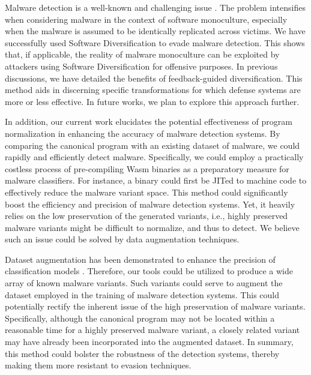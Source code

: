 \begin{strategy}

    Malware detection is a well-known and challenging issue \cite{cohen1987computer}. 
    The problem intensifies when considering malware in the context of software monoculture, especially when the malware is assumed to be identically replicated across victims. 
    We have successfully used Software Diversification to evade malware detection. 
    This shows that, if applicable, the reality of malware monoculture can be exploited by attackers using Software Diversification for offensive purposes. 
    In previous discussions, we have detailed the benefits of feedback-guided diversification. 
    This method aids in discerning specific transformations for which defense systems are more or less effective.
    In future works, we plan to explore this approach further.

    In addition, our current work elucidates the potential effectiveness of program normalization in enhancing the accuracy of malware detection systems. 
    By comparing the canonical program with an existing dataset of malware, we could rapidly and efficiently detect malware.
    Specifically, we could employ a practically costless process of pre-compiling Wasm binaries as a preparatory measure for malware classifiers. 
    For instance, a \wasm binary could first be JITed to machine code to effectively reduce the malware variant space. 
    This method could significantly boost the efficiency and precision of malware detection systems. 
    Yet, it heavily relies on the low preservation of the generated variants, i.e., highly preserved malware variants might be difficult to normalize, and thus to detect.
    We believe such an issue could be solved by data augmentation techniques.

    Dataset augmentation has been demonstrated to enhance the precision of classification models \cite{2021arXiv210311882S, selfAPR, 10.1109/TSE.2023.3240118}.
    Therefore, our tools could be utilized to produce a wide array of known malware variants.
    Such variants could serve to augment the dataset employed in the training of malware detection systems.
    This could potentially rectify the inherent issue of the high preservation of malware variants.
    Specifically, although the canonical program may not be located within a reasonable time for a highly preserved malware variant, a closely related variant may have already been incorporated into the augmented dataset.
    In summary, this method could bolster the robustness of the detection systems, thereby making them more resistant to evasion techniques.



\end{strategy}


